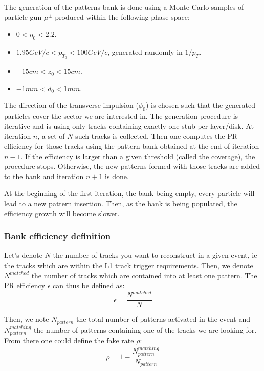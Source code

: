 \noindent The generation of the patterns bank is done using a Monte Carlo samples of particle gun $\mu^{\pm}$ produced within the following phase space:
\begin{itemize}
\item $0 < \eta_0 < 2.2$.
\item $1.95GeV/c < p_{T_0} < 100GeV/c$, generated randomly in $1/p_T$.
\item $-15cm < z_0 < 15cm$.
 \item $-1mm < d_0 < 1mm$.
\end{itemize}  

\noindent The direction of the transverse impulsion ($\phi_0$) is chosen such that the generated particles cover the sector we are interested in. The generation procedure is iterative and is using only tracks containing exactly one stub per layer/disk. At iteration $n$, a set of $N$ such tracks is collected. Then one computes the PR efficiency for those tracks using the pattern bank obtained at the end of iteration $n-1$. If the efficiency is larger than a given threshold (called the coverage), the procedure stops. Otherwise, the new patterns formed with those tracks are added to the bank and iteration $n+1$ is done. 

\noindent At the beginning of the first iteration, the bank being empty, every particle will lead to a new pattern insertion. Then, as the bank is being populated, the efficiency growth will become slower.

\subsubsection{Bank efficiency definition}

\noindent Let's denote $N$ the number of tracks you want to reconstruct in a given event, ie the tracks which are within the L1 track trigger requirements. Then, we denote $N^{matched}$ the number of tracks which are contained into at least one pattern. The PR efficiency $\epsilon$ can thus be defined as: 
\begin{equation}
\epsilon = \frac{N^{matched}}{N}
\end{equation} 

\noindent Then, we note $N_{pattern}$ the total number of patterns activated in the event and $N^{matching}_{pattern}$ the number of patterns containing one of the tracks we are looking for. From there one could define the fake rate $\rho$:
\begin{equation}
\rho = 1 - \frac{N^{matching}_{pattern}}{N_{pattern}}
\end{equation} 

